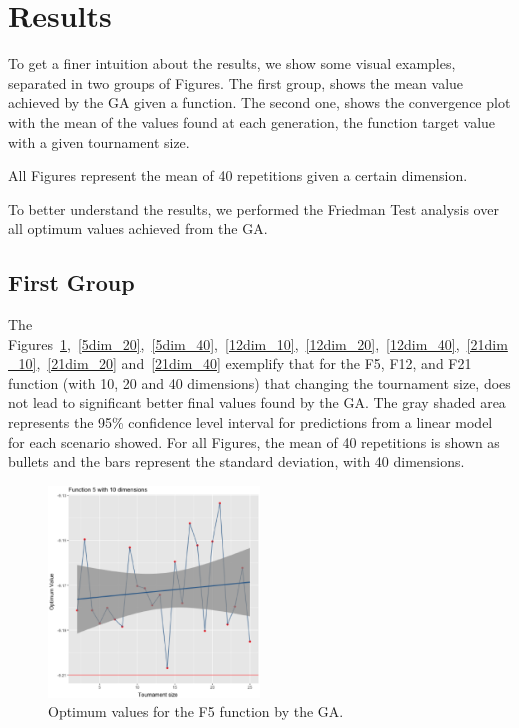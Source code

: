 \section{Results}\label{sec:results}

To get a finer intuition about the results, we show  some visual examples, separated in two groups of Figures. The first group, shows the mean value achieved by the GA given a function. The second one, shows the convergence plot with the mean of the values found at each generation, the function target value with a given tournament size.

All Figures represent the mean of 40 repetitions given a certain dimension.

To better understand the results, we performed the Friedman Test analysis over all optimum values achieved from the GA.%




\subsection{First Group}
The Figures~\ref{5dim_10},~\ref{5dim_20},~\ref{5dim_40},~\ref{12dim_10},~\ref{12dim_20},~\ref{12dim_40},~\ref{21dim_10},~\ref{21dim_20} and~\ref{21dim_40} exemplify that for the F5, F12, and F21 function (with 10, 20 and 40 dimensions) that changing the tournament size, does not lead to significant better final values found by the GA. The gray shaded area represents the 95\% confidence level interval for predictions from a linear model for each scenario showed. For all Figures, the mean of 40 repetitions is shown as bullets and the bars represent the standard deviation, with 40 dimensions.


\begin{figure}[H]
	\includegraphics[width=0.5\textwidth]{img/5dim_10.ps}
	\caption{Optimum values for the F5 function by the GA.}
	\label{5dim_10}
\end{figure}

